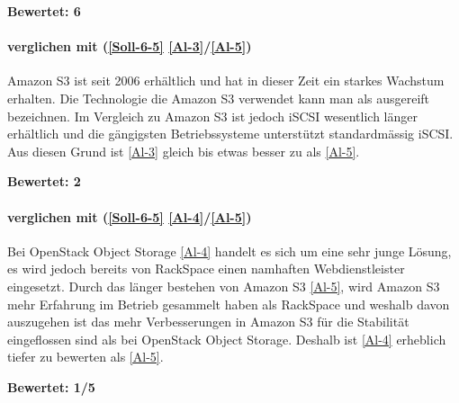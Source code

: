  \textbf{Bewertet: 6}

\paragraph*{  verglichen mit  (\ref{Soll-6-5} \ref{Al-3}/\ref{Al-5})}
Amazon S3 ist seit 2006 erhältlich und hat in dieser Zeit ein starkes Wachstum erhalten. Die Technologie die Amazon S3 verwendet kann man als ausgereift bezeichnen. Im Vergleich zu Amazon S3 ist jedoch iSCSI wesentlich länger erhältlich und die gängigsten Betriebssysteme unterstützt standardmässig iSCSI. 
Aus diesen Grund ist  \ref{Al-3} gleich bis etwas besser zu als \ref{Al-5}.

 \textbf{Bewertet: 2}

\paragraph*{  verglichen mit  (\ref{Soll-6-5} \ref{Al-4}/\ref{Al-5})}
Bei OpenStack Object Storage \ref{Al-4} handelt es sich um eine sehr junge Lösung, es wird jedoch bereits von RackSpace einen namhaften Webdienstleister eingesetzt. Durch das länger bestehen von Amazon S3 \ref{Al-5}, wird Amazon S3 mehr Erfahrung im Betrieb gesammelt haben als RackSpace und weshalb davon auszugehen ist das mehr Verbesserungen in Amazon S3 für die Stabilität eingeflossen sind als bei OpenStack Object Storage. Deshalb ist \ref{Al-4} erheblich tiefer zu bewerten als \ref{Al-5}.

\textbf{Bewertet: 1/5}





